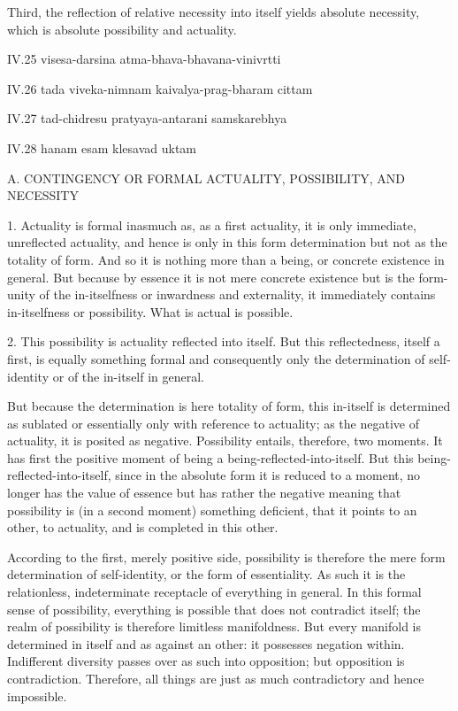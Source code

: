Third, the reflection of relative necessity
into itself yields absolute necessity,
which is absolute possibility and actuality.

IV.25
visesa-darsina atma-bhava-bhavana-vinivrtti

IV.26
tada viveka-nimnam kaivalya-prag-bharam cittam

IV.27
tad-chidresu pratyaya-antarani samskarebhya

IV.28
hanam esam klesavad uktam

A. CONTINGENCY OR FORMAL ACTUALITY, POSSIBILITY, AND NECESSITY

1. Actuality is formal inasmuch as, as a first actuality,
it is only immediate, unreflected actuality,
and hence is only in this form determination
but not as the totality of form.
And so it is nothing more than a being,
or concrete existence in general.
But because by essence it is not mere concrete existence
but is the form-unity of the in-itselfness
or inwardness and externality,
it immediately contains in-itselfness or possibility.
What is actual is possible.

2. This possibility is actuality reflected into itself.
But this reflectedness, itself a first, is equally something formal
and consequently only the determination of self-identity
or of the in-itself in general.

But because the determination is here totality of form,
this in-itself is determined as sublated
or essentially only with reference to actuality;
as the negative of actuality, it is posited as negative.
Possibility entails, therefore, two moments.
It has first the positive moment
of being a being-reflected-into-itself.
But this being-reflected-into-itself,
since in the absolute form it is reduced to a moment,
no longer has the value of essence but has rather
the negative meaning that possibility is (in a second moment)
something deficient, that it points to an other, to actuality,
and is completed in this other.

According to the first, merely positive side,
possibility is therefore the mere
form determination of self-identity,
or the form of essentiality.
As such it is the relationless, indeterminate
receptacle of everything in general.
In this formal sense of possibility,
everything is possible
that does not contradict itself;
the realm of possibility is therefore
limitless manifoldness.
But every manifold is determined in itself
and as against an other:
it possesses negation within.
Indifferent diversity passes over
as such into opposition;
but opposition is contradiction.
Therefore, all things are
just as much contradictory
and hence impossible.

